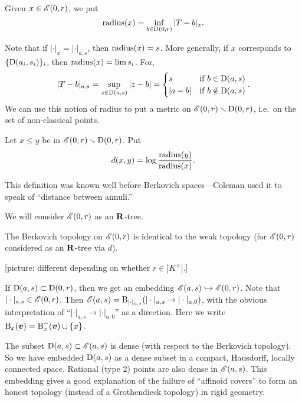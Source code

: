 \begin{definition}
Given $x\in \mathscr{E}(0,r)$, we put 
\[
	\operatorname{radius}(x) = \inf_{b\in \operatorname{D}(0,r)} |T-b|_x .
\]
\end{definition}

Note that if $|\cdot|_x=|\cdot|_{a,s}$, then $\operatorname{radius}(x)=s$. More generally, if 
$x$ corresponds to $\{\operatorname{D}(a_i,s_i)\}_i$, then $\operatorname{radius}(x) = \lim s_i$. For, 
\[
	|T-b|_{a,s} = \sup_{z\in \operatorname{D}(a,s)} |z-b| = 
	\begin{cases}
		s & \text{if }b\in \operatorname{D}(a,s) \\
		|a-b| & \text{if }b\notin \operatorname{D}(a,s) 
	\end{cases} .
\]
We can use this notion of radius to put a metric on 
$\mathscr{E}(0,r)\smallsetminus \operatorname{D}(0,r)$, i.e.~on the set of non-classical points. 

\begin{definition}
Let $x\leqslant y$ be in $\mathscr{E}(0,r)\smallsetminus \operatorname{D}(0,r)$. Put 
\[
	d(x,y) = \log{\frac{\operatorname{radius}(y)}{\operatorname{radius}(x)}} .
\]
\end{definition}
This definition was known well before Berkovich spaces---Coleman used it to 
speak of ``distance between annuli.'' 

We will consider $\mathscr{E}(0,r)$ as an $\mathbf{R}$-tree. 

\begin{theorem}
The Berkovich topology on $\mathscr{E}(0,r)$ is identical to the weak topology (for 
$\mathscr{E}(0,r)$ considered as an $\mathbf{R}$-tree via $d$). 
\end{theorem}

[picture: different depending on whether $r\in |K^\times|$.] 

If $\operatorname{D}(a,s)\subset \operatorname{D}(0,r)$, then we get an embedding 
$\mathscr{E}(a,s)\hookrightarrow \mathscr{E}(0,r)$. Note that $|\cdot|_{a,s}\in \mathscr{E}(0,r)$. 
Then $\mathscr{E}(a,s) = \operatorname{B}_{|\cdot|_{a,s}}(|\cdot|_{a,s} \to |\cdot|_{a,0})$, with 
the obvious interpretation of ``$|\cdot|_{a,s} \to |\cdot|_{a,0}$'' as a 
direction. Here we write $\operatorname{B}_x(\bm v) = \operatorname{B}_x^-(\bm v)\cup\{x\}$. 

The subset $\operatorname{D}(a,s)\subset \mathscr{E}(a,s)$ is dense (with respect to the Berkovich 
topology). So we have embedded $\operatorname{D}(a,s)$ as a dense subset in a compact, 
Hausdorff, locally connected space. Rational (type 2) points are also dense in 
$\mathscr{E}(a,s)$. This embedding gives a good explanation of the failure of 
``affinoid covers'' to form an honest topology (instead of a Grothendieck 
topology) in rigid geometry. 





